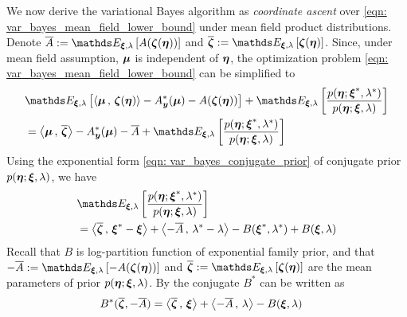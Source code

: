 \documentclass[11pt]{article}
\begin{document}
We now derive the variational Bayes algorithm as \emph{coordinate ascent} over \eqref{eqn: var_bayes_mean_field_lower_bound} under mean field product distributions. Denote $\overline{A}:=  \E{\mb{\xi}, \lambda}{A(\mb{\zeta}(\mb{\eta})) }$ and $\overline{\mb{\zeta}} := \E{\mb{\xi}, \lambda}{\mb{\zeta}(\mb{\eta})}$.  Since, under mean field assumption, $\boldsymbol{\mu}$ is independent of $\boldsymbol{\eta}$, the optimization problem \eqref{eqn: var_bayes_mean_field_lower_bound} can be simplified to
\begin{align}
&\E{\mb{\xi}, \lambda}{\inn{\mb{\mu} }{\mb{\zeta}(\mb{\eta})} - A_{\mb{y}}^{*}(\mb{\mu} )  - A(\mb{\zeta}(\mb{\eta})) }  + \E{\mb{\xi}, \lambda}{\frac{p(\mb{\eta}; \mb{\xi}^{*}, \lambda^{*})}{p(\mb{\eta}; \mb{\xi}, \lambda)} } \nonumber\\
&= \inn{\mb{\mu} }{\overline{\mb{\zeta}}}- A_{\mb{y}}^{*}(\mb{\mu} )  - \overline{A} + \E{\mb{\xi}, \lambda}{\frac{p(\mb{\eta}; \mb{\xi}^{*}, \lambda^{*})}{p(\mb{\eta}; \mb{\xi}, \lambda)} }  \label{eqn: var_bayes_mean_field_lower_bound_2}
\end{align}  Using the exponential form \eqref{eqn: var_bayes_conjugate_prior} of conjugate prior $p(\boldsymbol{\eta}; \boldsymbol{\xi}, \lambda)$, we have
\begin{align}
&\E{\mb{\xi}, \lambda}{\frac{p(\mb{\eta}; \mb{\xi}^{*}, \lambda^{*})}{p(\mb{\eta}; \mb{\xi}, \lambda)} } \nonumber\\
&= \inn{\overline{\mb{\zeta}}} {\mb{\xi}^{*} - \mb{\xi}}+\inn{-\overline{A}}{ \lambda^{*}  - \lambda} - B( \mb{\xi}^{*}, \lambda^{*})  + B(\mb{\xi}, \lambda) \label{eqn: var_bayes_mean_field_lower_bound_prior_diff}
\end{align} Recall that $B$ is log-partition function of exponential family prior, and that $-\overline{A}:=  \E{\mb{\xi}, \lambda}{-A(\mb{\zeta}(\mb{\eta})) }$ and $\overline{\mb{\zeta}} := \E{\mb{\xi}, \lambda}{\mb{\zeta}(\mb{\eta})}$ are the mean parameters of prior $p(\boldsymbol{\eta}; \boldsymbol{\xi}, \lambda)$.  By the conjugate $B^{*}$ can be written as 
\begin{align}
B^{*}(\overline{\boldsymbol{\zeta}}, -\overline{A}) &= \left\langle \overline{\boldsymbol{\zeta}}\,,\, \boldsymbol{\xi} \right\rangle + \left\langle -\overline{A}\,,\, \lambda \right\rangle - B(\boldsymbol{\xi}, \lambda) \label{eqn: var_bayes_conjugate_dual_prior_entropy}
\end{align}
\end{document}
